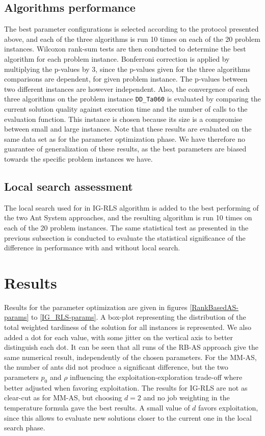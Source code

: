 \documentclass[runningheads]{llncs}
\begin{document}
\subsection{Algorithms performance}

The best parameter configurations is selected according to the protocol
presented above, and each of the three algorithms is run 10 times on each of the
20 problem instances. Wilcoxon rank-sum tests are then conducted to determine
the best algorithm for each problem instance. Bonferroni correction is applied
by multiplying the p-values by 3, since the p-values given for the three
algorithms comparisons are dependent, for  given problem instance. The p-values
between two different instances are however independent. Also, the convergence
of each three algorithms on the problem instance \texttt{DD\_Ta060} is evaluated
by comparing the current solution quality against execution time and the number
of calls to the evaluation function. This instance is chosen because its size is
a compromise between small and large instances. Note that these results are
evaluated on the same data set as for the parameter optimization phase. We have
therefore no guarantee of generalization of these results, as the best
parameters are biased towards the specific problem instances we have.

\subsection{Local search assessment}

The local search used for in IG-RLS algorithm is added to the best performing of
the two Ant System approaches, and the resulting algorithm is run 10 times on
each of the 20 problem instances. The same statistical test as presented in the
previous subsection is conducted to evaluate the statistical significance of the
difference in performance with and without local search.


\section{Results}
\label{sec:res}

Results for the parameter optimization are given in figures
\ref{RankBasedAS-params} to \ref{IG_RLS-params}. A box-plot representing the
distribution of the total weighted tardiness of the solution for all instances
is represented. We also added a dot for each value, with some jitter on the
vertical axis to better distinguish each dot. It can be seen that all runs of
the RB-AS approach give the same numerical result, independently of the chosen
parameters. For the MM-AS, the number of ants did not produce a significant
difference, but the two parameters $p_0$ and $\rho$ influencing the
exploitation-exploration trade-off where better adjusted when favoring
exploitation. The results for IG-RLS are not as clear-cut as for MM-AS, but
choosing $d=2$ and no job weighting in the temperature formula gave the best
results. A small value of $d$ favors exploitation, since this allows to evaluate
new solutions closer to the current one in the local search phase.
\end{document}
